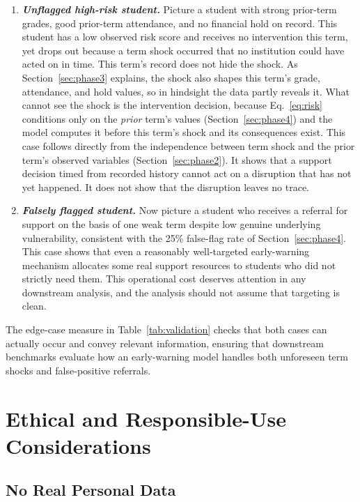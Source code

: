\documentclass[11pt]{article}
\begin{document}
\begin{enumerate}[topsep=2pt,itemsep=3pt,parsep=0pt]
\item \textbf{\textit{Unflagged high-risk student.}} Picture a student with strong prior-term grades, good prior-term attendance, and no financial hold on record. This student has a low observed risk score and receives no intervention this term, yet drops out because a term shock occurred that no institution could have acted on in time. This term's record does not hide the shock. As Section~\ref{sec:phase3} explains, the shock also shapes this term's grade, attendance, and hold values, so in hindsight the data partly reveals it. What cannot see the shock is the intervention decision, because Eq.~\ref{eq:risk} conditions only on the \emph{prior} term's values (Section~\ref{sec:phase4}) and the model computes it before this term's shock and its consequences exist. This case follows directly from the independence between term shock and the prior term's observed variables (Section~\ref{sec:phase2}). It shows that a support decision timed from recorded history cannot act on a disruption that has not yet happened. It does not show that the disruption leaves no trace.
\item \textbf{\textit{Falsely flagged student.}} Now picture a student who receives a referral for support on the basis of one weak term despite low genuine underlying vulnerability, consistent with the 25\% false-flag rate of Section~\ref{sec:phase4}. This case shows that even a reasonably well-targeted early-warning mechanism allocates some real support resources to students who did not strictly need them. This operational cost deserves attention in any downstream analysis, and the analysis should not assume that targeting is clean.
\end{enumerate}

The edge-case measure in Table~\ref{tab:validation} checks that both cases can actually occur and convey relevant information, ensuring that downstream benchmarks evaluate how an early-warning model handles both unforeseen term shocks and false-positive referrals.

\FloatBarrier
\section{Ethical and Responsible-Use Considerations}
\label{sec:ethics}

\subsection{No Real Personal Data}
\label{sec:ethics-A}
\end{document}
